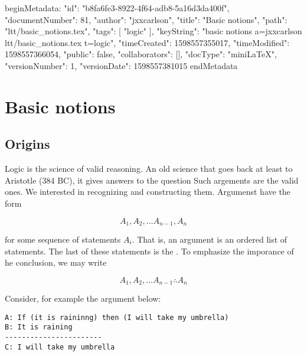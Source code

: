 beginMetadata:
{
    "id": "b8fa6fe3-8922-4f64-adb8-5a16d3da400f",
    "documentNumber": 81,
    "author": "jxxcarlson",
    "title": "Basic notions",
    "path": "ltt/basic_notions.tex",
    "tags": [
        "logic"
    ],
    "keyString": "basic notions a=jxxcarlson ltt/basic_notions.tex t=logic",
    "timeCreated": 1598557355017,
    "timeModified": 1598557366054,
    "public": false,
    "collaborators": [],
    "docType": "miniLaTeX",
    "versionNumber": 1,
    "versionDate": 1598557381015
}
endMetadata
\begin{mathmacro}
\newcommand{\set}[1]{\{ #1 \}}
\newcommand{\for}[0]{\mathcal{F}}
\newcommand{\axioms}[0]{\mathcal{A}}
\newcommand{\theorems}[0]{\mathcal{T}}
\end{mathmacro}

\section{Basic notions}

\innertableofcontents


\subsection{Origins}

Logic is the science of valid reasoning.  An old science that goes back at least to Aristotle (384 BC), it gives answers to the question 
Such argements are the valid ones.  We interested in recognizing and constructing them. Argumenst have the form

\begin{equation}
\label{argument}
A_1, A_2, \ldots A_{n-1}, A_n
\end{equation}

for some sequence of statements $A_i$.  That is, an argument is an ordered list of statements.  The last of these statements is the .  To emphasize the imporance of he conclusion, we may write

\begin{equation}
\label{argument2}
A_1, A_2, \ldots A_{n-1} \therefore A_n
\end{equation}

Consider, for example the argument below:

\begin{verbatim}
A: If (it is raininng) then (I will take my umbrella)
B: It is raining
-----------------------
C: I will take my umbrella
\end{verbatim}

